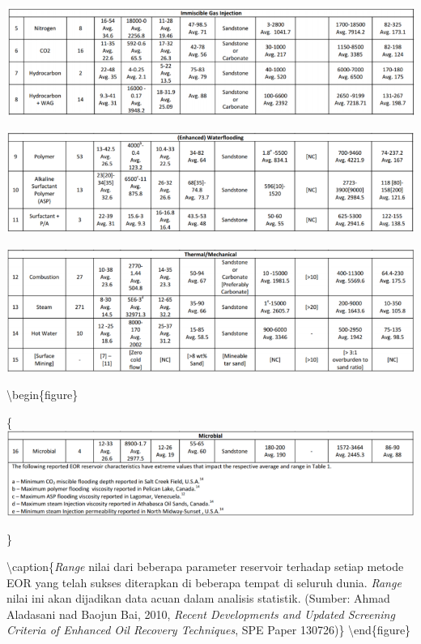 \documentclass[
]{book}
\begin{document}
\begin{center}\includegraphics[width=1\linewidth]{images/screening/immiscible} \end{center}

\begin{center}\includegraphics[width=1\linewidth]{images/screening/waterflooding} \end{center}

\begin{center}\includegraphics[width=1\linewidth]{images/screening/thermal} \end{center}

\textbackslash begin\{figure\}

\{\centering \includegraphics[width=1\linewidth]{images/screening/microbial}

\}

\textbackslash caption\{\emph{Range} nilai dari beberapa parameter reservoir terhadap setiap metode EOR yang telah sukses diterapkan di beberapa tempat di seluruh dunia. \emph{Range} nilai ini akan dijadikan data acuan dalam analisis statistik. (Sumber: Ahmad Aladasani nad Baojun Bai, 2010, \emph{Recent Developments and Updated Screening Criteria of Enhanced Oil Recovery Techniques}, SPE Paper 130726)\}\label{fig:unnamed-chunk-15}
\textbackslash end\{figure\}
\end{document}
